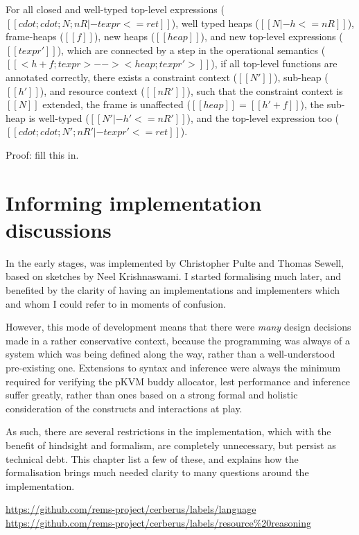 \begin{theorem}
For all closed and well-typed top-level expressions
($[[ cdot ; cdot ; N ; nR |- texpr <= ret ]]$),
well typed heaps ($[[ N |- h <= nR ]]$),
frame-heaps ($[[ f ]]$),
new heaps ($[[ heap ]]$),
and new top-level expressions ($[[ texpr' ]]$),
which are connected by a step in the operational semantics
($[[ < h + f ; texpr > -->  < heap ; texpr' > ]]$),
if all top-level functions are annotated correctly,
there exists a constraint context ($[[ N' ]]$),
sub-heap ($[[ h' ]]$),
and resource context ($[[ nR' ]]$),
such that the constraint context is $[[ N ]]$ extended,
the frame is unaffected ($[[ heap ]] = [[ h' + f ]]$),
the sub-heap is well-typed ($[[ N' |- h' <= nR' ]]$),
and the top-level expression too
($[[ cdot ; cdot ; N' ; nR' |- texpr' <= ret ]]$).
\end{theorem}
Proof: fill this in.


\chapter{Informing implementation discussions}\label{chap:inform-impl}

In the early stages,  was implemented by Christopher Pulte and Thomas
Sewell, based on sketches by Neel Krishnaswami. I started formalising
 much later, and benefited by the clarity of having an
implementations and implementers which and whom I could refer to in moments of
confusion.

However, this mode of development means that there were \emph{many} design
decisions made in a rather conservative context, because the programming was
always of a system which was being defined along the way, rather than a
well-understood pre-existing one. Extensions to syntax and inference were
always the minimum required for verifying the pKVM buddy allocator, lest
performance and inference suffer greatly, rather than ones based on a strong
formal and holistic consideration of the constructs and interactions at play.

As such, there are several restrictions in the implementation, which with the
benefit of hindsight and formalism, are completely unnecessary, but persist as
technical debt. This chapter list a few of these, and explains how the
formalisation brings much needed clarity to many questions around the
implementation.

\url{https://github.com/rems-project/cerberus/labels/language}
\url{https://github.com/rems-project/cerberus/labels/resource\%20reasoning}

